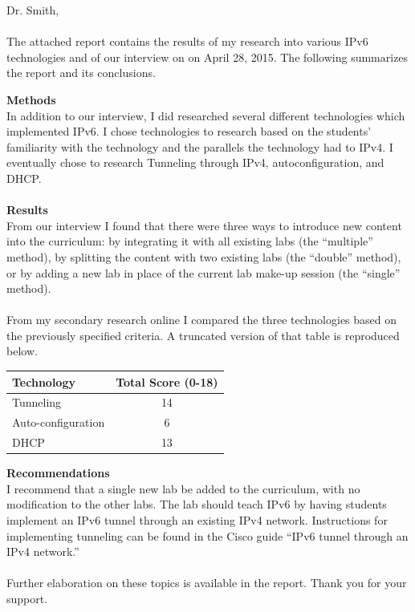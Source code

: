 \documentclass[letterpaper,12pt]{texMemo}
\begin{document}
\thispagestyle{empty}
\maketitle


Dr. Smith,\\\\
The attached report contains the results of my research into various IPv6 technologies and of our interview on on April 28, 2015. The following summarizes the report and its conclusions.

\textbf{Methods}\\
In addition to our interview, I did researched several different technologies which implemented IPv6. I chose technologies to research based on the students' familiarity with the technology and the parallels the technology had to IPv4. I eventually chose to research Tunneling through IPv4, autoconfiguration, and DHCP.\\\\
\textbf{Results}\\
From our interview I found that there were three ways to introduce new content into the curriculum: by integrating it with all existing labs (the ``multiple'' method), by splitting the content with two existing labs (the ``double'' method), or by adding a new lab in place of the current lab make-up session (the ``single'' method).\\\\
From my secondary research online I compared the three technologies based on the previously specified criteria. A truncated version of that table is reproduced below.

\begin{tabulary}{\textwidth}{|L|C|}
  \hline
  Technology & Total Score (0-18) \\ \hline\hline
  Tunneling          & 14 \\ \hline
  Auto-configuration & 6 \\ \hline
  DHCP               & 13 \\ \hline
\end{tabulary}
\medskip

\textbf{Recommendations}\\
I recommend that a single new lab be added to the curriculum, with no modification to the other labs. The lab should teach IPv6 by having students implement an IPv6 tunnel through an existing IPv4 network. Instructions for implementing tunneling can be found in the Cisco guide ``IPv6 tunnel through an IPv4 network.''\\\\
Further elaboration on these topics is available in the report. Thank you for your support.

\end{document}
